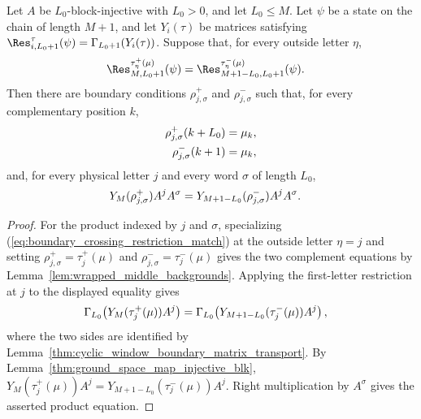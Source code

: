 \begin{lemma}
    \label{lem:closure_property_auxiliary_product_from_closing_restrictions}
    \leanok
    Let $A$ be $L_0$-block-injective with $L_0>0$, and let $L_0\le M$.
    Let $\psi$ be a state on the chain of length $M+1$, and let
    $Y_i(\tau)$ be matrices satisfying
    $\Res^{\tau}_{i,L_0+1}(\psi)=\Gamma_{L_0+1}(Y_i(\tau))$.
    Suppose that, for every outside letter $\eta$,
    \begin{align}
        \Res^{\tau^+_\eta(\mu)}_{M,L_0+1}(\psi)
         & =
        \Res^{\tau^-_\eta(\mu)}_{M+1-L_0,L_0+1}(\psi).
        \label{eq:boundary_crossing_restriction_match}
    \end{align}
    Then there are boundary conditions $\rho^+_{j,\sigma}$ and
    $\rho^-_{j,\sigma}$ such that, for every complementary position $k$,
    \begin{align}
        \rho^+_{j,\sigma}(k+L_0)
         & =
        \mu_k,
        \notag \\
        \rho^-_{j,\sigma}(k+1)
         & =
        \mu_k,
        \notag
    \end{align}
    and, for every physical letter $j$ and every word $\sigma$ of length
    $L_0$,
    \begin{align}
        Y_M(\rho^+_{j,\sigma})A^jA^\sigma
         & =
        Y_{M+1-L_0}(\rho^-_{j,\sigma})A^jA^\sigma.
        \notag
    \end{align}
\end{lemma}

\begin{proof}
    \leanok
    For the product indexed by $j$ and $\sigma$, specializing
    (\ref{eq:boundary_crossing_restriction_match}) at the outside letter
    $\eta=j$ and setting $\rho^+_{j,\sigma}=\tau^+_j(\mu)$ and
    $\rho^-_{j,\sigma}=\tau^-_j(\mu)$ gives the two complement equations by
    Lemma~\ref{lem:wrapped_middle_backgrounds}. Applying the first-letter
    restriction at $j$ to the displayed equality gives
    \begin{align}
        \Gamma_{L_0}\!\left(Y_M(\tau^+_j(\mu))A^j\right)
         & =
        \Gamma_{L_0}\!\left(Y_{M+1-L_0}(\tau^-_j(\mu))A^j\right),
        \notag
    \end{align}
    where the two sides are identified by
    Lemma~\ref{thm:cyclic_window_boundary_matrix_transport}. By
    Lemma~\ref{thm:ground_space_map_injective_blk},
    $Y_M(\tau^+_j(\mu))A^j = Y_{M+1-L_0}(\tau^-_j(\mu))A^j$.
    Right multiplication by $A^\sigma$ gives the asserted product equation.
\end{proof}

